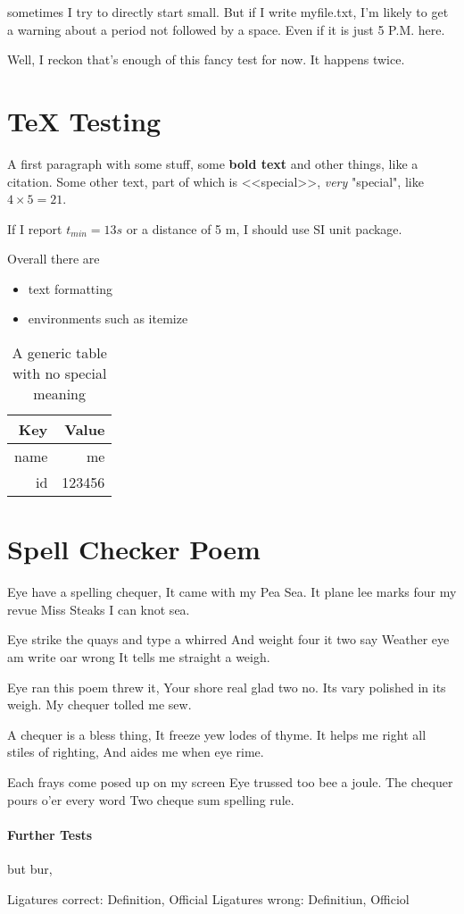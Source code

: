 \documentclass{scrartcl}
\begin{document}
sometimes I try to directly start small. But if I write myfile.txt, I'm likely to get a warning about a period not followed by a space. Even if it is just 5 P.M. here.

Well, I reckon that's enough of this fancy test for now. It happens twice. 





\section{TeX Testing}\label{sec:texsection}
A first paragraph with some stuff, some \textbf{bold text}   and other things, like a citation\cite{my:paper}.
Some other text, part of which is <<special>>, \emph{very} "special", like $4 \times 5 = 21$.

If I report $t_{min} = 13s$ or a distance of 5 m, I should use SI unit package.


Overall there are 
\begin{itemize}
	\item text formatting
	\item environments such as itemize
\end{itemize}


\begin{table}
	\centering
    \begin{tabular}{@{}rr@{}} 
    \textbf{Key}  & \textbf{Value} \\ \hline
    name & me \\
    id & 123456\\
    \end{tabular}
    \caption{A generic table with no special meaning}
    \label{tab:example}
\end{table}


\section{Spell Checker Poem}
Eye have a spelling chequer,
It came with my Pea Sea.
It plane lee marks four my revue
Miss Steaks I can knot sea.

Eye strike the quays and type a whirred
And weight four it two say
Weather eye am write oar wrong
It tells me straight a weigh.

Eye ran this poem threw it,
Your shore real glad two no.
Its vary polished in its weigh.
My chequer tolled me sew.

A chequer is a bless thing,
It freeze yew lodes of thyme.
It helps me right all stiles of righting,
And aides me when eye rime.

Each frays come posed up on my screen
Eye trussed too bee a joule.
The chequer pours o'er every word
Two cheque sum spelling rule.


\paragraph{Further Tests}
but bur, 

Ligatures correct: Deﬁnition, Oﬀicial
Ligatures wrong: Deﬁnitiun, Oﬀiciol
\end{document}
